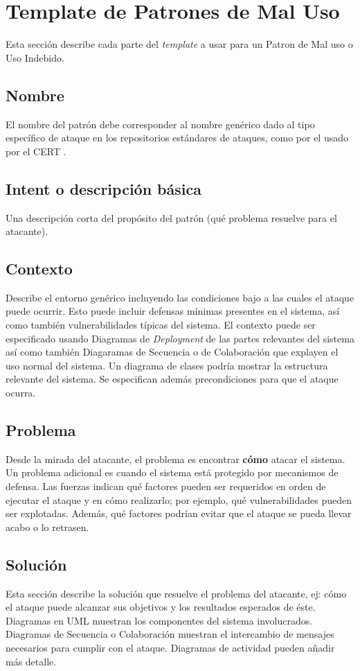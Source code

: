 \section{Template de Patrones de Mal Uso}
\label{chap5:TemplateMP}
Esta sección describe cada parte del \textit{template} a usar para un Patron de Mal uso o Uso Indebido.

\subsection*{Nombre}
El nombre del patrón debe corresponder al nombre genérico dado al tipo específico de ataque en los repositorios estándares de ataques, como por el usado por el CERT \cite{cve}.

\subsection*{Intent o descripción básica}
Una descripción corta del propósito del patrón (qué problema resuelve para el atacante).

\subsection*{Contexto}
Describe el entorno genérico incluyendo las condiciones bajo a las cuales el ataque puede ocurrir. Esto puede incluir defensas mínimas presentes en el sistema, así como también vulnerabilidades típicas del sistema. El contexto puede ser especificado usando Diagramas de \textit{Deployment} de las partes relevantes del sistema así como también Diagaramas de Secuencia o de Colaboración que explayen el uso normal del sistema. Un diagrama de clases podría mostrar la estructura relevante del sistema. Se especifican además precondiciones para que el ataque ocurra.

\subsection*{Problema}
Desde la mirada del atacante, el problema es encontrar \textbf{cómo} atacar el sistema. Un problema adicional es cuando el sistema está protegido por mecanismos de defensa. Las fuerzas indican qué factores pueden ser requeridos en orden de ejecutar el ataque y en cómo realizarlo; por ejemplo, qué vulnerabilidades pueden ser explotadas. Además, qué factores podrían evitar que el ataque se pueda llevar acabo o lo retrasen.

\subsection*{Solución}
Esta sección describe la solución que resuelve el problema del atacante, ej: cómo el ataque puede alcanzar sus objetivos y los resultados esperados de éste. Diagramas en UML muestran los componentes del sistema involucrados. Diagramas de Secuencia o Colaboración muestran el intercambio de mensajes necesarios para cumplir con el ataque. Diagramas de actividad pueden añadir más detalle.

